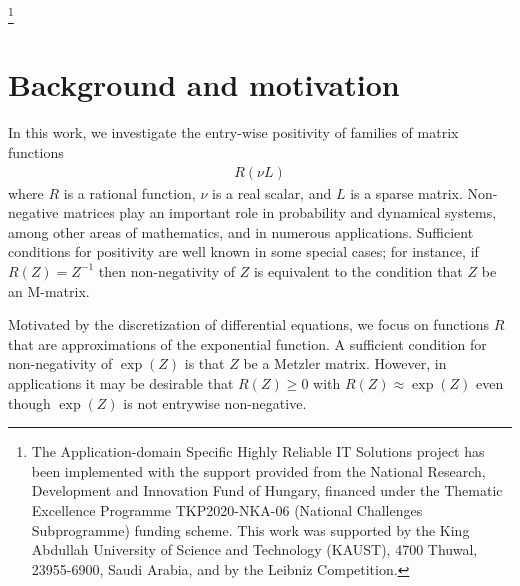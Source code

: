 \documentclass[smallextended,numbook,runningheads]{svjour3}     %
\newcommand\blfootnote[1]{%
  \begingroup
  \renewcommand\thefootnote{}\footnote{#1}%
  \addtocounter{footnote}{-1}%
  \endgroup
}
\begin{document}
\ifjournal
\fi

\ifarxiv
	\blfootnote{The Application-domain Specific Highly Reliable IT Solutions project  has been implemented with
		the support provided from the National Research, Development and Innovation Fund of Hungary, financed
		under the Thematic Excellence Programme TKP2020-NKA-06 (National Challenges Subprogramme)
		funding scheme.
		This work was supported by the King Abdullah University of Science and Technology (KAUST), 4700
		Thuwal, 23955-6900, Saudi Arabia, and by the Leibniz Competition.}
\fi

\section{Background and motivation}
In this work, we investigate the entry-wise positivity of families of matrix functions
\begin{align*}
   R(\nu L)
\end{align*}
where $R$ is a rational function, $\nu$ is a real scalar, and $L$ is a sparse matrix.
Non-negative matrices play an important role in probability and dynamical systems,
among other areas of mathematics, and in numerous applications.
Sufficient conditions for positivity are well known in some special cases; for instance,
if $R(Z)=Z^{-1}$ then non-negativity of $Z$ is equivalent to the condition that $Z$ be an M-matrix.  

Motivated by the discretization of differential equations,
we focus on functions $R$ that are approximations of the exponential function.  
A sufficient condition for non-negativity of $\exp(Z)$ is that $Z$ be a Metzler matrix.
However, in applications it may be desirable that $R(Z)\ge 0$ with $R(Z)\approx \exp(Z)$
even though $\exp(Z)$ is not entrywise non-negative.
\end{document}
